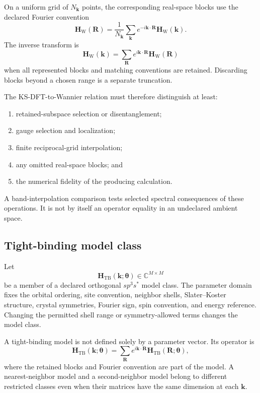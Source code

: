 On a uniform grid of $N_{\mathbf k}$ points, the corresponding real-space
blocks use the declared Fourier convention
\begin{equation}
    \mathbf H_{\mathrm W}(\mathbf R)
    =
    \frac{1}{N_{\mathbf k}}
    \sum_{\mathbf k}
    e^{-i\mathbf k\cdot\mathbf R}
    \mathbf H_{\mathrm W}(\mathbf k).
\end{equation}
The inverse transform is
\begin{equation}
    \mathbf H_{\mathrm W}(\mathbf k)
    =
    \sum_{\mathbf R}
    e^{i\mathbf k\cdot\mathbf R}
    \mathbf H_{\mathrm W}(\mathbf R)
\end{equation}
when all represented blocks and matching conventions are retained. Discarding
blocks beyond a chosen range is a separate truncation.

The KS-DFT-to-Wannier relation must therefore distinguish at least:
\begin{enumerate}
    \item retained-subspace selection or disentanglement;
    \item gauge selection and localization;
    \item finite reciprocal-grid interpolation;
    \item any omitted real-space blocks; and
    \item the numerical fidelity of the producing calculation.
\end{enumerate}
A band-interpolation comparison tests selected spectral consequences of these
operations. It is not by itself an operator equality in an undeclared ambient
space.

\subsection*{Tight-binding model class}

Let
\begin{equation}
    \mathbf H_{\mathrm{TB}}(\mathbf k;\boldsymbol\theta)
    \in
    \mathbb C^{M\times M}
\end{equation}
be a member of a declared orthogonal $sp^3s^{\ast}$ model class. The parameter
domain fixes the orbital ordering, site convention, neighbor shells,
Slater--Koster structure, crystal symmetries, Fourier sign, spin convention,
and energy reference. Changing the permitted shell range or symmetry-allowed
terms changes the model class.

A tight-binding model is not defined solely by a parameter vector. Its
operator is
\begin{equation}
    \mathbf H_{\mathrm{TB}}(\mathbf k;\boldsymbol\theta)
    =
    \sum_{\mathbf R}
    e^{i\mathbf k\cdot\mathbf R}
    \mathbf H_{\mathrm{TB}}(\mathbf R;\boldsymbol\theta),
\end{equation}
where the retained blocks and Fourier convention are part of the model. A
nearest-neighbor model and a second-neighbor model belong to different
restricted classes even when their matrices have the same dimension at each
$\mathbf k$.

